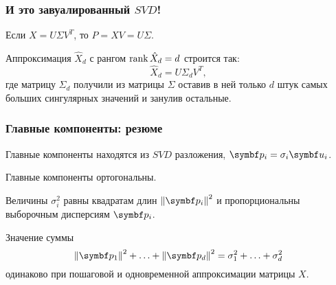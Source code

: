 \begin{frame}
  \frametitle{И это завуалированный $SVD$!}

  Если $X = U\Sigma V^T$, то $P = XV = U\Sigma$. \pause


  Аппроксимация $\hat X_d$ с рангом $\rank \hat X_d = d$ строится так:
  \[
  \hat X_d = U \Sigma_d V^T,  
  \]
  где матрицу $\Sigma_d$ получили из матрицы $\Sigma$ оставив в ней только $d$ штук
  самых больших сингулярных значений и занулив остальные.


\end{frame}



\begin{frame}
  \frametitle{Главные компоненты: резюме}

  Главные компоненты находятся из $SVD$ разложения, $\bp_i = \sigma_i \bu_i$. 

  Главные компоненты ортогональны. 

  Величины $\sigma^2_i$ равны квадратам длин $\norm{\bp_i}^2$ 
  и пропорциональны выборочным дисперсиям $\bp_i$.  \pause

  Значение суммы 
  \[
    \norm{\bp_1}^2 + \ldots + \norm{\bp_d}^2 = \sigma^2_1 + \ldots + \sigma^2_d
  \]
  одинаково при пошаговой и одновременной аппроксимации матрицы $X$.


\end{frame}

